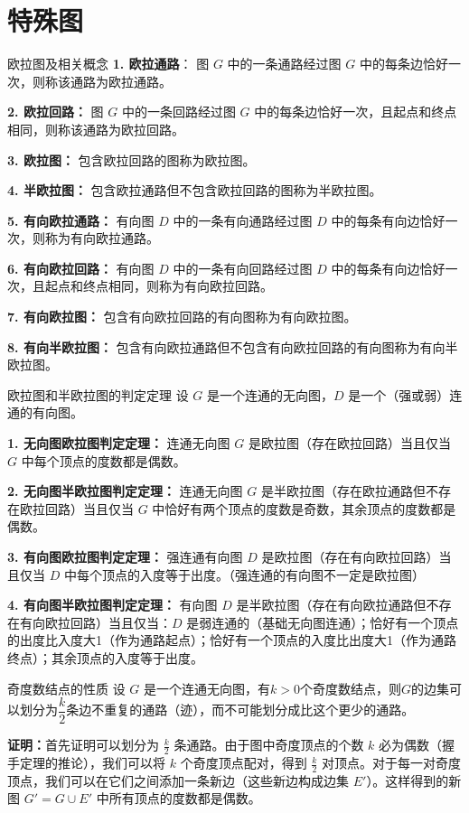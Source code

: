 \documentclass[lang=cn,11pt]{elegantbook}
\begin{document}
\section{特殊图}
\begin{definition}{欧拉图及相关概念}
\textbf{1. 欧拉通路}：
图 $G$ 中的一条通路经过图 $G$ 中的每条边恰好一次，则称该通路为欧拉通路。

\textbf{2. 欧拉回路：}
图 $G$ 中的一条回路经过图 $G$ 中的每条边恰好一次，且起点和终点相同，则称该通路为欧拉回路。

\textbf{3. 欧拉图：}
包含欧拉回路的图称为欧拉图。

\textbf{4. 半欧拉图：}
包含欧拉通路但不包含欧拉回路的图称为半欧拉图。

\textbf{5. 有向欧拉通路：}
有向图 $D$ 中的一条有向通路经过图 $D$ 中的每条有向边恰好一次，则称为有向欧拉通路。

\textbf{6. 有向欧拉回路：}
有向图 $D$ 中的一条有向回路经过图 $D$ 中的每条有向边恰好一次，且起点和终点相同，则称为有向欧拉回路。

\textbf{7. 有向欧拉图：}
包含有向欧拉回路的有向图称为有向欧拉图。

\textbf{8. 有向半欧拉图：}
包含有向欧拉通路但不包含有向欧拉回路的有向图称为有向半欧拉图。
\end{definition}
\begin{theorem}{欧拉图和半欧拉图的判定定理}
设 $G$ 是一个连通的无向图，$D$ 是一个（强或弱）连通的有向图。

\textbf{1. 无向图欧拉图判定定理：}
连通无向图 $G$ 是欧拉图（存在欧拉回路）当且仅当 $G$ 中每个顶点的度数都是偶数。

\textbf{2. 无向图半欧拉图判定定理：}
连通无向图 $G$ 是半欧拉图（存在欧拉通路但不存在欧拉回路）当且仅当 $G$ 中恰好有两个顶点的度数是奇数，其余顶点的度数都是偶数。

\textbf{3. 有向图欧拉图判定定理：}
强连通有向图 $D$ 是欧拉图（存在有向欧拉回路）当且仅当 $D$ 中每个顶点的入度等于出度。（强连通的有向图不一定是欧拉图）

\textbf{4. 有向图半欧拉图判定定理：}
有向图 $D$ 是半欧拉图（存在有向欧拉通路但不存在有向欧拉回路）当且仅当：$D$ 是弱连通的（基础无向图连通）；恰好有一个顶点的出度比入度大1（作为通路起点）；恰好有一个顶点的入度比出度大1（作为通路终点）；其余顶点的入度等于出度。
\end{theorem}
\begin{theorem}{奇度数结点的性质}
    设 $G$ 是一个连通无向图，有$k>0$个奇度数结点，则$G$的边集可以划分为$\dfrac{k}2$条边不重复的通路（迹），而不可能划分成比这个更少的通路。
\end{theorem}
\textbf{证明：}首先证明可以划分为 $\frac{k}{2}$ 条通路。由于图中奇度顶点的个数 $k$ 必为偶数（握手定理的推论），我们可以将 $k$ 个奇度顶点配对，得到 $\frac{k}{2}$ 对顶点。对于每一对奇度顶点，我们可以在它们之间添加一条新边（这些新边构成边集 $E'$）。这样得到的新图 $G' = G \cup E'$ 中所有顶点的度数都是偶数。
\end{document}
